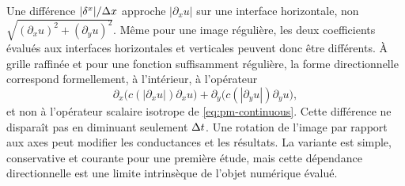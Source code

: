 Une différence $|\delta^x|/\Delta x$ approche $|\partial_xu|$ sur une
interface horizontale, non $\sqrt{(\partial_xu)^2+(\partial_yu)^2}$.
Même pour une image régulière, les deux coefficients évalués aux
interfaces horizontales et verticales peuvent donc être différents.
À grille raffinée et pour une fonction suffisamment régulière,
la forme directionnelle correspond formellement, à l'intérieur,
à l'opérateur
\begin{equation}
 \partial_x\bigl(c(|\partial_xu|)\partial_xu\bigr)
 +\partial_y\bigl(c(|\partial_yu|)\partial_yu\bigr),
 \label{eq:directional-limit}
\end{equation}
et non à l'opérateur scalaire isotrope de
\eqref{eq:pm-continuous}. Cette différence ne disparaît pas en
diminuant seulement $\Delta t$. Une rotation de l'image par rapport aux
axes peut modifier les conductances et les résultats. La variante
est simple, conservative et courante pour une première étude,
mais cette dépendance directionnelle est une limite intrinsèque
de l'objet numérique évalué.
